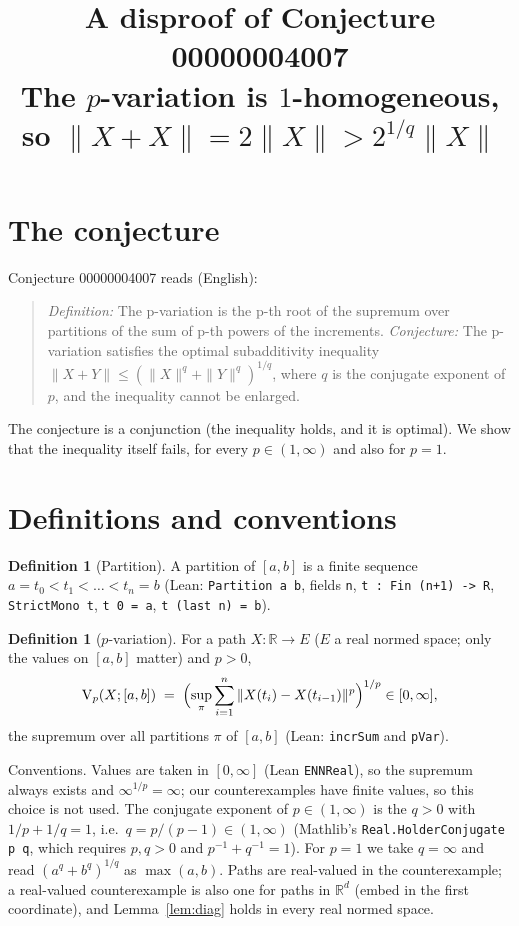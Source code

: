 \documentclass[11pt]{article}
\title{A disproof of Conjecture 00000004007\\[2pt]
\large The $p$-variation is $1$-homogeneous, so $\|X+X\| = 2\|X\| > 2^{1/q}\|X\|$}
\date{}
\renewcommand{\_}{\oldus\allowbreak}
\theoremstyle{definition}
\newtheorem{definition}[theorem]{Definition}
\theoremstyle{remark}
\newcommand{\V}{\operatorname{V}_p}
\begin{document}
\sloppy
\maketitle

\section{The conjecture}

Conjecture 00000004007 reads (English):
\begin{quote}
\emph{Definition:} The p-variation is the p-th root of the supremum over partitions of the sum of
p-th powers of the increments. \emph{Conjecture:} The p-variation satisfies the optimal
subadditivity inequality $\|X+Y\| \le (\|X\|^q + \|Y\|^q)^{1/q}$, where $q$ is the conjugate
exponent of $p$, and the inequality cannot be enlarged.
\end{quote}
The conjecture is a conjunction (the inequality holds, and it is optimal). We show that the
inequality itself fails, for every $p\in(1,\infty)$ and also for $p=1$.

\section{Definitions and conventions}

\begin{definition}[Partition]
A partition of $[a,b]$ is a finite sequence $a=t_0<t_1<\dots<t_n=b$ (Lean: \texttt{Partition a b},
fields \texttt{n}, \texttt{t : Fin (n+1) -> R}, \texttt{StrictMono t}, \texttt{t 0 = a},
\texttt{t (last n) = b}).
\end{definition}

\begin{definition}[$p$-variation]
For a path $X:\mathbb{R}\to E$ ($E$ a real normed space; only the values on $[a,b]$ matter) and
$p>0$,
\[
  \V(X;[a,b]) \;=\; \Bigl(\sup_{\pi} \sum_{i=1}^{n} \|X(t_i)-X(t_{i-1})\|^p\Bigr)^{1/p}
  \in [0,\infty],
\]
the supremum over all partitions $\pi$ of $[a,b]$ (Lean: \texttt{incrSum} and \texttt{pVar}).
\end{definition}

Conventions. Values are taken in $[0,\infty]$ (Lean \texttt{ENNReal}), so the supremum always
exists and $\infty^{1/p}=\infty$; our counterexamples have finite values, so this choice is not
used. The conjugate exponent of $p\in(1,\infty)$ is the $q>0$ with $1/p+1/q=1$, i.e.\
$q=p/(p-1)\in(1,\infty)$ (Mathlib's \texttt{Real.HolderConjugate p q}, which requires $p,q>0$ and
$p^{-1}+q^{-1}=1$). For $p=1$ we take $q=\infty$ and read $(a^q+b^q)^{1/q}$ as $\max(a,b)$.
Paths are real-valued in the counterexample; a real-valued counterexample is also one for paths in
$\mathbb{R}^d$ (embed in the first coordinate), and Lemma~\ref{lem:diag} holds in every real normed
space.
\end{document}
